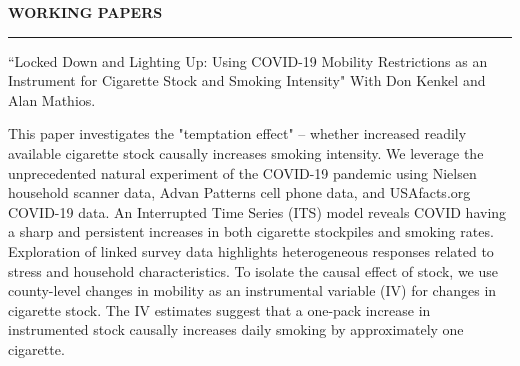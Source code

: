 \documentclass[11pt]{article}
\newenvironment{rSection}[1]{
  \vspace{1.5em}
  \noindent\textbf{\MakeUppercase{#1}}
  \vspace{0.2em}\hrule\vspace{0.5em}
}{}
\renewenvironment{quote}{%
  \list{}{\rightmargin=0pt \leftmargin=1.5em}%
  \item\relax
}
{\endlist}
\begin{document}
\begin{rSection}{Working Papers}
    ``Locked Down and Lighting Up: Using COVID-19 Mobility Restrictions as an Instrument for Cigarette Stock and Smoking Intensity" With Don Kenkel and Alan Mathios.
    \begin{quote}
        \small{This paper investigates the "temptation effect" – whether increased readily available cigarette stock causally increases smoking intensity. We leverage the unprecedented natural experiment of the COVID-19 pandemic using Nielsen household scanner data, Advan Patterns cell phone data, and USAfacts.org COVID-19 data. An Interrupted Time Series (ITS) model reveals COVID having a sharp and persistent increases in both cigarette stockpiles and smoking rates. Exploration of linked survey data highlights heterogeneous responses related to stress and household characteristics. To isolate the causal effect of stock, we use county-level changes in mobility as an instrumental variable (IV) for changes in cigarette stock. The IV estimates suggest that a one-pack increase in instrumented stock causally increases daily smoking by approximately one cigarette.}
    \end{quote}
\end{rSection}
\end{document}
